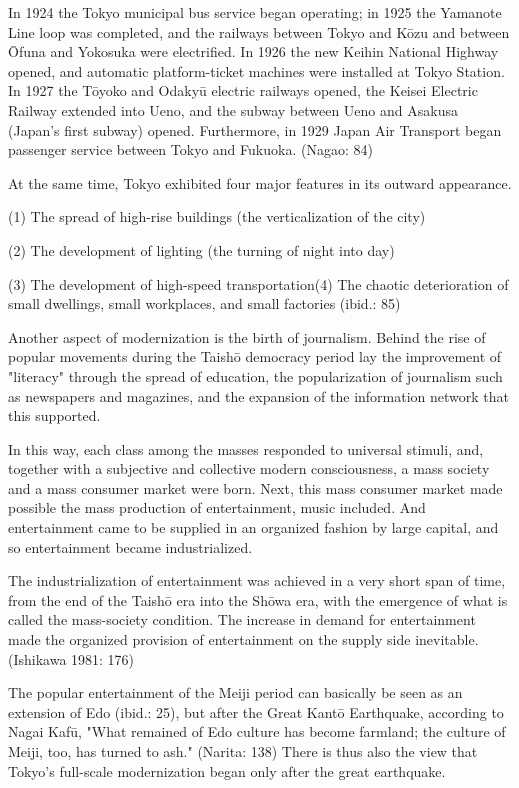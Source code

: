 In 1924 the Tokyo municipal bus service began operating; in 1925 the Yamanote Line loop was completed, and the railways between Tokyo and Kōzu and between Ōfuna and Yokosuka were electrified. In 1926 the new Keihin National Highway opened, and automatic platform-ticket machines were installed at Tokyo Station. In 1927 the Tōyoko and Odakyū electric railways opened, the Keisei Electric Railway extended into Ueno, and the subway between Ueno and Asakusa (Japan's first subway) opened. Furthermore, in 1929 Japan Air Transport began passenger service between Tokyo and Fukuoka. (Nagao: 84)

At the same time, Tokyo exhibited four major features in its outward appearance.

(1) The spread of high-rise buildings (the verticalization of the city)

(2) The development of lighting (the turning of night into day)

(3) The development of high-speed transportation(4) The chaotic deterioration of small dwellings, small workplaces, and small factories (ibid.: 85)

Another aspect of modernization is the birth of journalism. Behind the rise of popular movements during the Taishō democracy period lay the improvement of "literacy" through the spread of education, the popularization of journalism such as newspapers and magazines, and the expansion of the information network that this supported.

In this way, each class among the masses responded to universal stimuli, and, together with a subjective and collective modern consciousness, a mass society and a mass consumer market were born. Next, this mass consumer market made possible the mass production of entertainment, music included. And entertainment came to be supplied in an organized fashion by large capital, and so entertainment became industrialized.

\begin{gquote}
The industrialization of entertainment was achieved in a very short span of time, from the end of the Taishō era into the Shōwa era, with the emergence of what is called the mass-society condition. The increase in demand for entertainment made the organized provision of entertainment on the supply side inevitable. (Ishikawa 1981: 176)
\end{gquote}

The popular entertainment of the Meiji period can basically be seen as an extension of Edo (ibid.: 25), but after the Great Kantō Earthquake, according to Nagai Kafū, "What remained of Edo culture has become farmland; the culture of Meiji, too, has turned to ash." (Narita: 138) There is thus also the view that Tokyo's full-scale modernization began only after the great earthquake.

